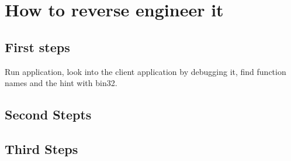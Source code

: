 \section{How to reverse engineer it}

\subsection{First steps}
Run application, look into the client application by debugging it, find function names
and the hint with bin32.
\subsection{Second Stepts}

\subsection{Third Steps}
